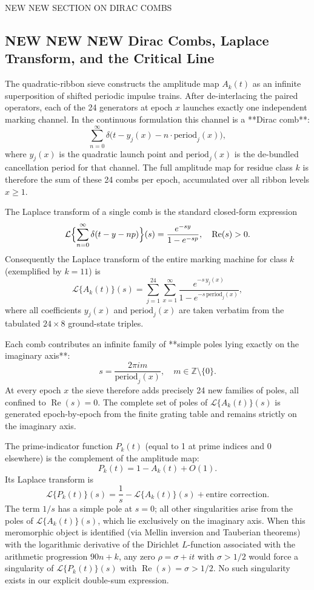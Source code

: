 \documentclass[11pt,a4paper]{article}
\begin{document}
NEW NEW SECTION ON DIRAC COMBS
\subsection{ NEW NEW NEW Dirac Combs, Laplace Transform, and the Critical Line}

The quadratic-ribbon sieve constructs the amplitude map \(A_k(t)\) as an infinite superposition of shifted periodic impulse trains. After de-interlacing the paired operators, each of the 24 generators at epoch \(x\) launches exactly one independent marking channel. In the continuous formulation this channel is a **Dirac comb**:
\[
\sum_{n=0}^\infty \delta\bigl(t - y_j(x) - n \cdot \text{period}_j(x)\bigr),
\]
where \(y_j(x)\) is the quadratic launch point and \(\text{period}_j(x)\) is the de-bundled cancellation period for that channel. The full amplitude map for residue class \(k\) is therefore the sum of these 24 combs per epoch, accumulated over all ribbon levels \(x \ge 1\).

The Laplace transform of a single comb is the standard closed-form expression
\[
\mathcal{L}\Bigl\{\sum_{n=0}^\infty \delta(t - y - n p)\Bigr\}(s) = \frac{e^{-s y}}{1 - e^{-s p}}, \quad \operatorname{Re}(s) > 0.
\]
Consequently the Laplace transform of the entire marking machine for class \(k\) (exemplified by \(k=11\)) is
\[
\mathcal{L}\{A_k(t)\}(s) = \sum_{j=1}^{24} \sum_{x=1}^\infty \frac{e^{-s\, y_j(x)}}{1 - e^{-s\, \text{period}_j(x)}},
\]
where all coefficients \(y_j(x)\) and \(\text{period}_j(x)\) are taken verbatim from the tabulated \(24 \times 8\) ground-state triples.

Each comb contributes an infinite family of **simple poles lying exactly on the imaginary axis**:
\[
s = \frac{2\pi i m}{\text{period}_j(x)}, \quad m \in \mathbb{Z} \setminus \{0\}.
\]
At every epoch \(x\) the sieve therefore adds precisely 24 new families of poles, all confined to \(\operatorname{Re}(s) = 0\). The complete set of poles of \(\mathcal{L}\{A_k(t)\}(s)\) is generated epoch-by-epoch from the finite grating table and remains strictly on the imaginary axis.

The prime-indicator function \(P_k(t)\) (equal to 1 at prime indices and 0 elsewhere) is the complement of the amplitude map:
\[
P_k(t) = 1 - A_k(t) + O(1).
\]
Its Laplace transform is
\[
\mathcal{L}\{P_k(t)\}(s) = \frac{1}{s} - \mathcal{L}\{A_k(t)\}(s) + \text{entire correction}.
\]
The term \(1/s\) has a simple pole at \(s=0\); all other singularities arise from the poles of \(\mathcal{L}\{A_k(t)\}(s)\), which lie exclusively on the imaginary axis. When this meromorphic object is identified (via Mellin inversion and Tauberian theorems) with the logarithmic derivative of the Dirichlet \(L\)-function associated with the arithmetic progression \(90n+k\), any zero \(\rho = \sigma + it\) with \(\sigma > 1/2\) would force a singularity of \(\mathcal{L}\{P_k(t)\}(s)\) with \(\operatorname{Re}(s) = \sigma > 1/2\). No such singularity exists in our explicit double-sum expression.
\end{document}
